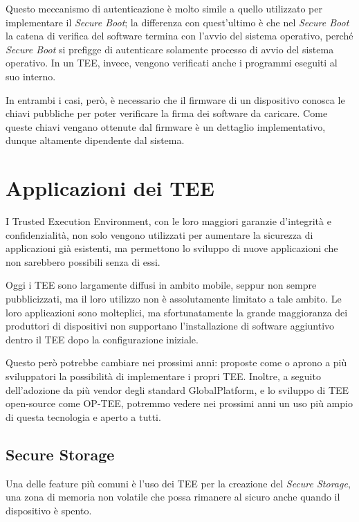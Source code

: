 \documentclass[12pt,italian]{report}
\begin{document}
Questo meccanismo di autenticazione è molto simile a quello utilizzato per
implementare il \textit{Secure Boot}; la differenza con quest'ultimo è che
nel \textit{Secure Boot} la catena di verifica del software termina con
l'avvio del sistema operativo, perché \textit{Secure Boot} si prefigge
di autenticare solamente processo di avvio del sistema operativo.
In un TEE, invece, vengono verificati anche i programmi
eseguiti al suo interno.

In entrambi i casi, però, è necessario che il firmware di un dispositivo
conosca le chiavi pubbliche per poter verificare la firma dei software
da caricare. Come queste chiavi vengano ottenute dal firmware è un dettaglio
implementativo, dunque altamente dipendente dal sistema.

\section{Applicazioni dei TEE}
\label{sec:applicazioni-tee}
I Trusted Execution Environment, con le loro maggiori garanzie d'integrità
e confidenzialità, non solo vengono utilizzati per aumentare la sicurezza
di applicazioni già esistenti, ma permettono lo sviluppo di nuove
applicazioni che non sarebbero possibili senza di essi.

Oggi i TEE sono largamente diffusi in ambito mobile, seppur non sempre
pubblicizzati, ma il loro utilizzo non è assolutamente limitato a tale ambito.
Le loro applicazioni sono molteplici, ma sfortunatamente la grande
maggioranza dei produttori di dispositivi non supportano
l'installazione di software aggiuntivo dentro il TEE dopo la
configurazione iniziale.

Questo però potrebbe cambiare nei prossimi anni: proposte come
\cite{kohlbrenner2020opentees} o \cite{penglai} aprono a più sviluppatori la
possibilità di implementare i propri TEE.
Inoltre, a seguito dell'adozione da più vendor degli standard GlobalPlatform,
e lo sviluppo di TEE open-source come OP-TEE, potremmo vedere nei prossimi
anni un uso più ampio di questa tecnologia e aperto a tutti.

\subsection{Secure Storage}
\label{subsec:secure-storage}
Una delle feature più comuni è l'uso dei TEE per la creazione del
\textit{Secure Storage}, una zona di memoria non volatile che possa rimanere
al sicuro anche quando il dispositivo è spento.
\end{document}

